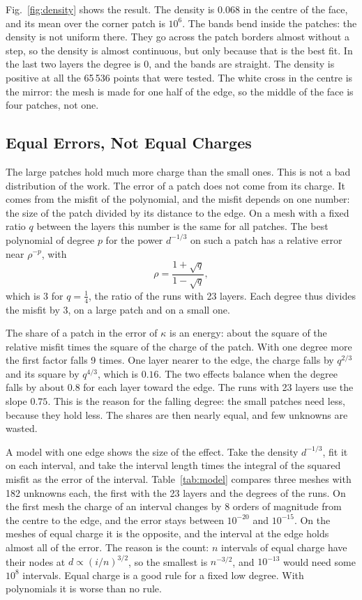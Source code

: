 \documentclass[journal]{IEEEtran}
\begin{document}
Fig.~\ref{fig:density} shows the result. The density is $0.068$ in the centre of the face, and its mean over the corner patch is $10^6$. The bands bend inside the patches: the density is not uniform there. They go across the patch borders almost without a step, so the density is almost continuous, but only because that is the best fit. In the last two layers the degree is 0, and the bands are straight. The density is positive at all the 65\,536 points that were tested. The white cross in the centre is the mirror: the mesh is made for one half of the edge, so the middle of the face is four patches, not one.

\subsection{Equal Errors, Not Equal Charges}
The large patches hold much more charge than the small ones. This is not a bad distribution of the work. The error of a patch does not come from its charge. It comes from the misfit of the polynomial, and the misfit depends on one number: the size of the patch divided by its distance to the edge. On a mesh with a fixed ratio $q$ between the layers this number is the same for all patches. The best polynomial of degree $p$ for the power $d^{-1/3}$ on such a patch has a relative error near $\rho^{-p}$, with
\begin{equation}
\rho = \frac{1 + \sqrt q}{1 - \sqrt q},
\label{eq:rho}
\end{equation}
which is 3 for $q = \frac14$, the ratio of the runs with 23 layers. Each degree thus divides the misfit by 3, on a large patch and on a small one.

The share of a patch in the error of $\kappa$ is an energy: about the square of the relative misfit times the square of the charge of the patch. With one degree more the first factor falls 9 times. One layer nearer to the edge, the charge falls by $q^{2/3}$ and its square by $q^{4/3}$, which is $0.16$. The two effects balance when the degree falls by about $0.8$ for each layer toward the edge. The runs with 23 layers use the slope $0.75$. This is the reason for the falling degree: the small patches need less, because they hold less. The shares are then nearly equal, and few unknowns are wasted.

A model with one edge shows the size of the effect. Take the density $d^{-1/3}$, fit it on each interval, and take the interval length times the integral of the squared misfit as the error of the interval. Table~\ref{tab:model} compares three meshes with 182 unknowns each, the first with the 23 layers and the degrees of the runs. On the first mesh the charge of an interval changes by 8 orders of magnitude from the centre to the edge, and the error stays between $10^{-20}$ and $10^{-15}$. On the meshes of equal charge it is the opposite, and the interval at the edge holds almost all of the error. The reason is the count: $n$ intervals of equal charge have their nodes at $d \propto (i/n)^{3/2}$, so the smallest is $n^{-3/2}$, and $10^{-13}$ would need some $10^{8}$ intervals. Equal charge is a good rule for a fixed low degree. With polynomials it is worse than no rule.
\end{document}
